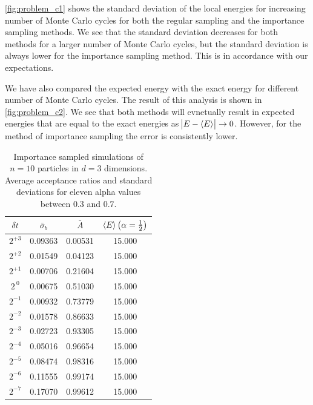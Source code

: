 \documentclass[
    a4paper, aps, twocolumn, floatfix, superscriptaddress, nofootinbib]{revtex4-1}
\newcommand{\1}{\mathds{1}}
\begin{document}
            \autoref{fig:problem_c1} shows the standard deviation of the local
            energies for increasing number of Monte Carlo cycles for both the
            regular sampling and the importance sampling methods. We see that
            the standard deviation decreases for both methods for a larger
            number of Monte Carlo cycles, but the standard deviation is always
            lower for the importance sampling method. This is in accordance with
            our expectations.

            We have also compared the expected energy with the exact energy for
            different number of Monte Carlo cycles. The result of this analysis
            is shown in \autoref{fig:problem_c2}. We see that both methods will
            evnetually result in expected energies that are equal to the exact
            energies as $\abs{E - \expval{E}} \to 0$. However, for the method of
            importance sampling the error is consistently lower.

            \begin{table}
                \caption{Importance sampled simulations of $n=10$ particles in
                $d=3$ dimensions. Average acceptance ratios and standard
                deviations for eleven alpha values between $0.3$ and $0.7$.}
                \centering
                    \begin{ruledtabular}
                        \begin{tabular}{cccc}
                            $\delta t$ & $\bar{\sigma}_b$ & $\bar{A}$
                            & $\expval{E}\left(\alpha = \frac{1}{2}\right)$ \\
                            \hline
                            $2^{+3}$ & 0.09363 & 0.00531 & 15.000 \\
                            $2^{+2}$ & 0.01549  & 0.04123 & 15.000 \\
                            $2^{+1}$ & 0.00706 & 0.21604 & 15.000 \\
                            $2^{\ 0}$ & 0.00675 & 0.51030 & 15.000 \\
                            $2^{-1}$ & 0.00932 & 0.73779 & 15.000 \\
                            $2^{-2}$ & 0.01578 & 0.86633 & 15.000 \\
                            $2^{-3}$ & 0.02723 & 0.93305 & 15.000 \\
                            $2^{-4}$ & 0.05016 & 0.96654 & 15.000 \\
                            $2^{-5}$ & 0.08474 & 0.98316 & 15.000 \\
                            $2^{-6}$ & 0.11555 & 0.99174 & 15.000 \\
                            $2^{-7}$ & 0.17070 & 0.99612 & 15.000 \\
                        \end{tabular}
                    \end{ruledtabular}
                    \label{tab:imp_time_step}
            \end{table}
\end{document}
